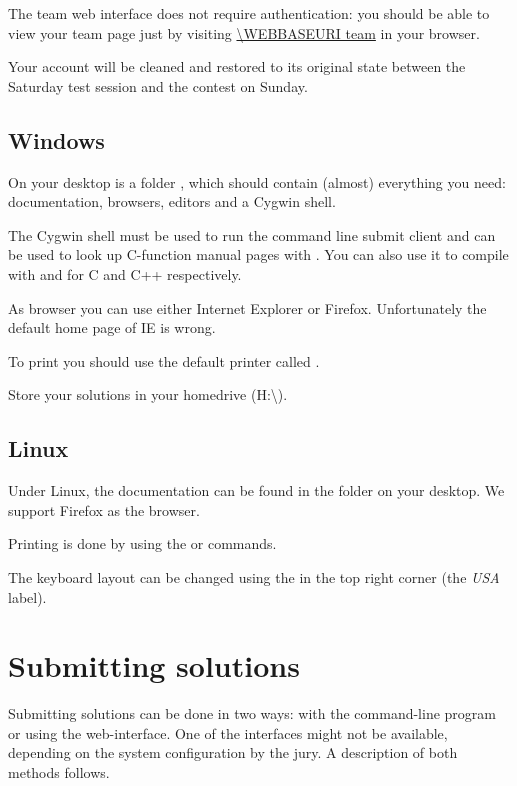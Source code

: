 The \DOMjudge team web interface does not require authentication: you
should be able to view your team page just by visiting \url{\WEBBASEURI
  team} in your browser.

Your account will be cleaned and restored to its original state
between the Saturday test session and the contest on Sunday.

\subsection{Windows}

On your desktop is a folder , which should contain (almost)
everything you need: documentation, browsers, editors and a Cygwin shell.

The Cygwin shell must be used to run the command line submit client and can be
used to look up C-function manual pages with . You can also
use it to compile with  and  for C and C++ respectively.

As browser you can use either Internet Explorer or Firefox. Unfortunately the
default home page of IE is wrong.

To print you should use the default printer called .

Store your solutions in your homedrive (H:\textbackslash).

\subsection{Linux}

Under Linux, the documentation can be found in the folder
 on your desktop. We support Firefox as the browser.

Printing is done by using the  or  commands.

The keyboard layout can be changed using the  in the top
right corner (the \emph{USA} label).

\newpage

\section{Submitting solutions}\label{submit}

Submitting solutions can be done in two ways: with the command-line
program  or using the web-interface. One of the
interfaces might not be available, depending on the system
configuration by the jury. A description of both methods follows.

